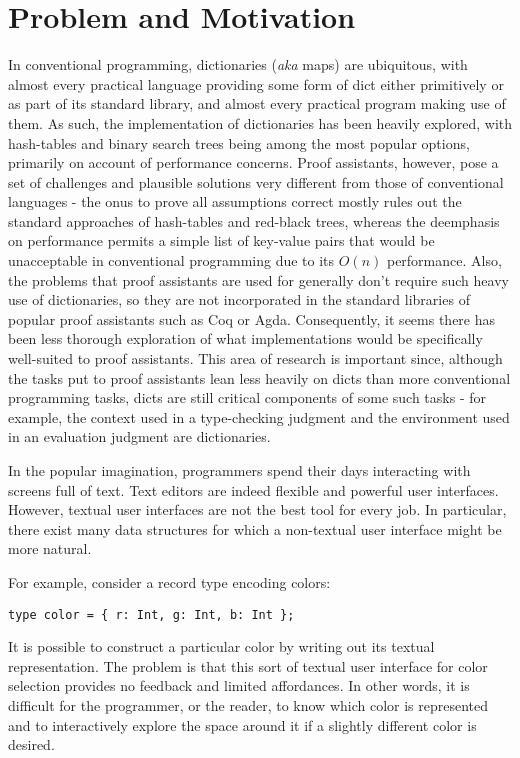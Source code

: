 \documentclass[nonacm]{acmart}
\theoremstyle{slplain}
\numberwithin{thm}{section}
\begin{document}
\section{Problem and Motivation}
In conventional programming, dictionaries (\emph{aka} maps) are ubiquitous, with almost every practical language providing
some form of dict either primitively or as part of its standard library, and almost every practical program making use of them.
As such, the implementation of dictionaries has been heavily explored, with hash-tables and binary search trees being among the
most popular options, primarily on account of performance concerns. Proof assistants, however, pose a set of challenges and
plausible solutions very different from those of conventional languages - the onus to prove all assumptions correct mostly rules out the
standard approaches of hash-tables and red-black trees, whereas the deemphasis on performance permits a simple list of key-value
pairs that would be unacceptable in conventional programming due to its $O(n)$ performance. Also, the problems that proof assistants are used
for generally don't require such heavy use of dictionaries, so they are not incorporated in the standard libraries of popular proof
assistants such as Coq or Agda. Consequently, it seems there has been less thorough exploration of what implementations would be specifically
well-suited to proof assistants. This area of research is important since, although the tasks put to proof assistants lean less heavily on
dicts than more conventional programming tasks, dicts are still critical components of some such tasks - for example, the context used in a
type-checking judgment and the environment used in an evaluation judgment are dictionaries.

In the popular imagination, programmers spend their days interacting with screens full of text. 
Text editors are indeed flexible and powerful user interfaces. However, textual user interfaces are not the best tool for every job. In particular, there exist many 
data structures for which a non-textual  
user interface might be more natural. 

For example, consider a record type encoding colors:
\begin{lstlisting}[numbers=none]
type color = { r: Int, g: Int, b: Int };
\end{lstlisting}
It is possible to construct a particular color by writing
out its textual representation.
The problem is that this sort of textual user interface for color selection provides no feedback and limited affordances. In other words, it is difficult for the programmer, or the reader, to know which color is represented and to interactively explore the space around it if a slightly different color is desired. 
\end{document}
